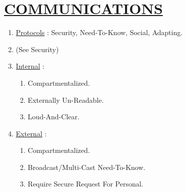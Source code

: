 \documentclass[11pt]{article}
\begin{document}
\section*{\ul{COMMUNICATIONS}}
\begin{enumerate}
	\item[] \ul{Protocols} : Security, Need-To-Know, Social, Adapting.
	\item[] (See Security)
	
	\item[] \ul{Internal} :
	\begin{enumerate}
		\item[] Compartmentalized.
		\item[] Externally Un-Readable.
		\item[] Loud-And-Clear.
	\end{enumerate}

	\item[] \ul{External} :
	\begin{enumerate}
		\item[] Compartmentalized.
		\item[] Broadcast/Multi-Cast Need-To-Know.
		\item[] Require Secure Request For Personal.
	\end{enumerate}
\end{enumerate}
\end{document}
